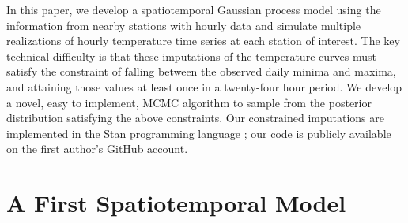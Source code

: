 \documentclass[letter]{article}
\renewcommand{\cite}[1]{\citep{#1}}
\begin{document}
In this paper, we develop a spatiotemporal Gaussian process model using the information from nearby stations with hourly data and simulate multiple realizations of hourly temperature time series at each station of interest. The key technical difficulty is that these imputations of the temperature curves must satisfy the constraint of falling between the observed daily minima and maxima, and attaining those values at least once in a twenty-four hour period.
We develop a novel, easy to implement, MCMC algorithm to sample from the posterior distribution satisfying the above constraints. Our constrained imputations are implemented in the Stan programming language \cite{stancite}; our code is publicly available on the first author's GitHub account.

\section{A First Spatiotemporal Model}\label{a-spatiotemporal-model}
\end{document}
